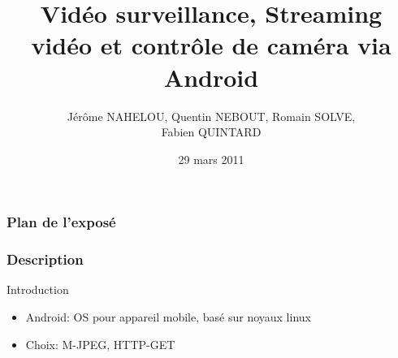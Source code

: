 \documentclass{beamer}
\title{Vidéo surveillance, Streaming vidéo et contrôle de caméra via Android }
\author{Jérôme NAHELOU, Quentin NEBOUT, Romain SOLVE,\\Fabien QUINTARD}
\institute{\large{Chargé de Projet : Yérom-David Bromberg}\\ \bigskip{}
\small{Université Bordeaux 1}}
\date{29 mars 2011}
\begin{document}


\begin{frame}
\frametitle{Plan de l'exposé}
\small{\tableofcontents[hideallsubsections]}
\end{frame}

  \begin{frame}
   \frametitle{Description}
  Introduction
   \begin{itemize}
    \item Android: OS pour appareil mobile, basé sur noyaux linux
    \item Choix: M-JPEG, HTTP-GET
   \end{itemize}
  \end{frame}
  
 
\end{document}
